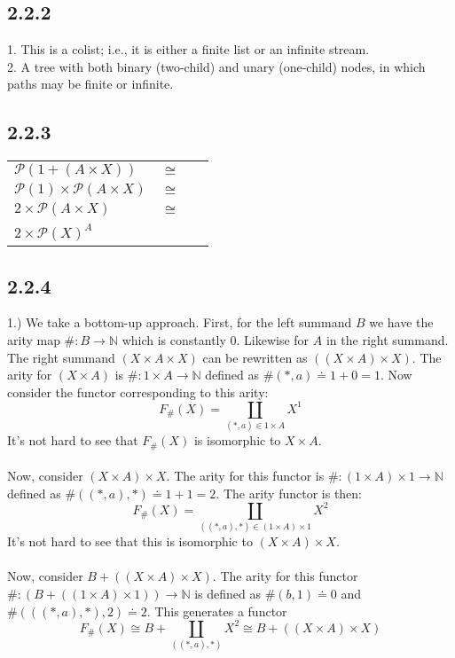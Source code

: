 \documentclass{article}
\begin{document}
\subsection*{2.2.2}

1. This is a colist; i.e., it is either a finite list or an infinite stream. \\
2. A tree with both binary (two-child) and unary (one-child) nodes, in which paths may be finite or infinite.

\subsection*{2.2.3}

\begin{tabular}{lll}
$\mathcal P(1 + (A \times X))$ & $\cong$ & \\
$\mathcal P(1) \times \mathcal P(A \times X)$ & $\cong$ & \\ 
$2 \times \mathcal P(A \times X)$ & $\cong$ & \\
$2 \times \mathcal P(X)^A$ & ~ & ~  
\end{tabular}

\subsection*{2.2.4}

1.) We take a bottom-up approach. First, for the left summand $B$ we have the arity map $\# : B \to \mathbb N$ which
is constantly 0. Likewise for $A$ in the right summand. The right summand $(X \times A \times X)$ can be rewritten
as $((X \times A) \times X)$. The arity for $(X \times A)$ is $\# : 1 \times A \to \mathbb N$ defined as $\# (\ast, a) \doteq 1 + 0 = 1$. Now consider the functor corresponding to this arity:
$$F_{\#} (X) = \coprod_{(\ast,a) \in 1 \times A} X^{1}$$ 
It's not hard to see that $F_{\#}(X)$ is isomorphic to $X \times A$.\\~\\
Now, consider $(X \times A) \times X$. The arity for this functor is $\# : (1 \times A) \times 1 \to \mathbb N$ defined
as $\#((\ast,a),\ast) \doteq 1 + 1 = 2$. The arity functor is then:
$$F_{\#}(X) = \coprod_{((\ast,a),\ast) \in (1 \times A) \times 1} X^{2} $$
It's not hard to see that this is isomorphic to $(X \times A) \times X$.\\~\\
Now, consider $B + ((X \times A) \times X)$. The arity for this functor $\# : (B + ((1 \times A) \times 1)) \to \mathbb N$
is defined as $\# (b,1) \doteq 0$ and $\# (((\ast, a),\ast),2) \doteq 2$. This generates a functor
$$F_{\#}(X) \cong B + \coprod_{((\ast,a),\ast)} X^2 \cong B + ((X \times A) \times X)$$ 
\end{document}
